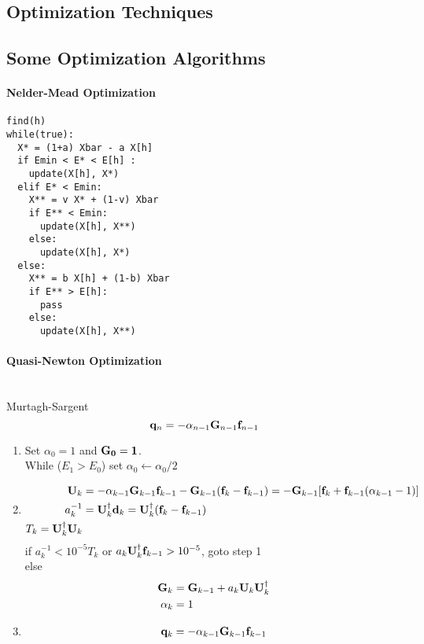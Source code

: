 \documentclass[a4paper]{article}
\newcommand{\iden}{{\large \bm{1}}}
\numberwithin{equation}{section}
\begin{document}
\subsection{Optimization Techniques}

\subsection{Some Optimization Algorithms}
\paragraph{Nelder-Mead Optimization}
\begin{verbatim}
find(h)
while(true):
  X* = (1+a) Xbar - a X[h] 
  if Emin < E* < E[h] :
    update(X[h], X*)
  elif E* < Emin:
    X** = v X* + (1-v) Xbar
    if E** < Emin:
      update(X[h], X**)
    else:
      update(X[h], X*)
  else:
    X** = b X[h] + (1-b) Xbar
    if E** > E[h]:
      pass
    else:
      update(X[h], X**)    
\end{verbatim}

\paragraph{Quasi-Newton Optimization}~\\
Murtagh-Sargent
\begin{equation}\label{key}
\vb{q}_n = -\alpha_{n-1}\vb{G}_{n-1}\vb{f}_{n-1}
\end{equation}
\begin{enumerate}
	\item Set $ \alpha_0 = 1 $ and $ \vb{G_0} = \iden $.\\
	While ($ E_1 > E_0 $) set $ \alpha_0 \leftarrow \alpha_0/2 $
	\item 
	\begin{align}
	\vb{U}_k &= -\alpha_{k-1}\vb{G}_{k-1}\vb{f}_{k-1} - \vb{G}_{k-1} (\vb{f}_k - \vb{f}_{k-1}) = -\vb{G}_{k-1}[\vb{f}_k + \vb{f}_{k-1}(\alpha_{k-1}-1)] \\
	a_k^{-1} &= \vb{U}_k^\dagger \vb{d}_k = \vb{U}_k^\dagger (\vb{f}_k - \vb{f}_{k-1}) \\
	T_k = \vb{U}_k^\dagger\vb{U}_k
	\end{align}
	if $ a_k^{-1} < 10^{-5} T_k $ or $ a_k\vb{U}_k^\dagger\vb{f}_{k-1} > 10^{-5} $, goto step 1\\
	else
	\begin{align}
	\vb{G}_k &= \vb{G}_{k-1} + a_k\vb{U}_k\vb{U}_k^\dagger \\
	\alpha_k &= 1
	\end{align}
	\item 
	\begin{align}
	\vb{q}_k &= -\alpha_{k-1}\vb{G}_{k-1}\vb{f}_{k-1} \\
	\end{align}
\end{enumerate}
  
\end{document}
